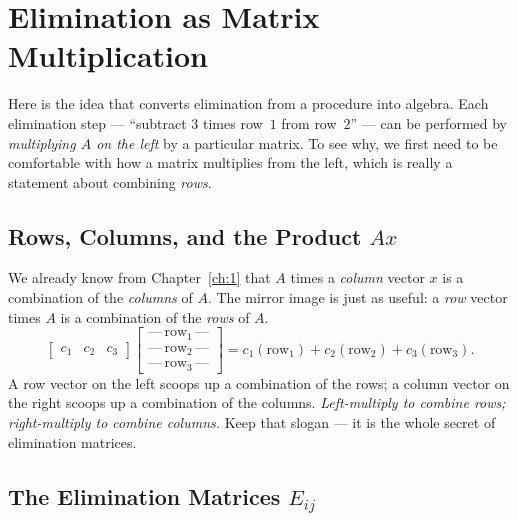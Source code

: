 
\section{Elimination as Matrix Multiplication}

Here is the idea that converts elimination from a procedure into algebra. Each elimination step --- ``subtract $3$ times row~$1$ from row~$2$'' --- can be performed by \emph{multiplying $A$ on the left} by a particular matrix. To see why, we first need to be comfortable with how a matrix multiplies from the left, which is really a statement about combining \emph{rows}.

\subsection{Rows, Columns, and the Product $Ax$}

We already know from Chapter~\ref{ch:1} that $A$ times a \emph{column} vector $x$ is a combination of the \emph{columns} of $A$. The mirror image is just as useful: a \emph{row} vector times $A$ is a combination of the \emph{rows} of $A$.
\[
\begin{bmatrix} c_1 & c_2 & c_3\end{bmatrix}
\begin{bmatrix} \text{---}\,\text{row}_1\,\text{---}\\ \text{---}\,\text{row}_2\,\text{---}\\ \text{---}\,\text{row}_3\,\text{---}\end{bmatrix}
= c_1(\text{row}_1) + c_2(\text{row}_2) + c_3(\text{row}_3).
\]
A row vector on the left scoops up a combination of the rows; a column vector on the right scoops up a combination of the columns. \emph{Left-multiply to combine rows; right-multiply to combine columns.} Keep that slogan --- it is the whole secret of elimination matrices.

\subsection{The Elimination Matrices $E_{ij}$}

